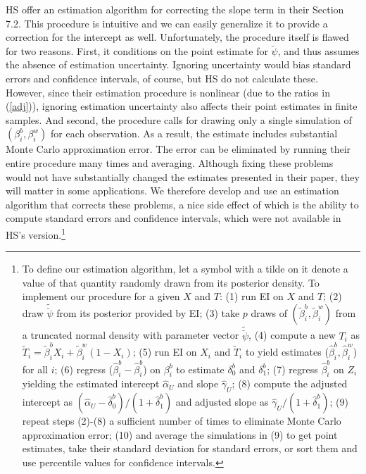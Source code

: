 \documentclass[11pt,titlepage]{article}
\newcommand{\psiu}{\breve{\psi}}
\begin{document}
HS offer an estimation algorithm for correcting the slope term in
their Section 7.2.  This procedure is intuitive and we can easily
generalize it to provide a correction for the intercept as well.
Unfortunately, the procedure itself is flawed for two reasons.  First,
it conditions on the point estimate for $\breve\psi$, and thus assumes
the absence of estimation uncertainty.  Ignoring uncertainty would
bias standard errors and confidence intervals, of course, but HS do
not calculate these.  However, since their estimation procedure is
nonlinear (due to the ratios in (\ref{adj})), ignoring estimation
uncertainty also affects their point estimates in finite samples.  And
second, the procedure calls for drawing only a single simulation of
$(\beta_i^b,\beta_i^w)$ for each observation.  As a result, the
estimate includes substantial Monte Carlo approximation error.  The
error can be eliminated by running their entire procedure many times
and averaging.  Although fixing these problems would not have
substantially changed the estimates presented in their paper, they
will matter in some applications.  We therefore develop and use an
estimation algorithm that corrects these problems, a nice side effect
of which is the ability to compute standard errors and confidence
intervals, which were not available in HS's version.\footnote{To
  define our estimation algorithm, let a symbol with a tilde on it
  denote a value of that quantity randomly drawn from its posterior
  density.  To implement our procedure for a given $X$ and $T$: (1)
  run EI on $X$ and $T$; (2) draw $\tilde\psiu$ from its posterior
  provided by EI; (3) take $p$ draws of
  $(\tilde\beta_i^b,\tilde\beta_i^w)$ from a truncated normal density
  with parameter vector $\tilde\psiu$, (4) compute a new $T_i$ as
  $\tilde T_i=\tilde\beta_i^bX_i+\tilde\beta_i^w(1-X_i)$; (5) run EI
  on $X_i$ and $\tilde T_i$ to yield estimates
  ($\hat\beta_i^b,\hat\beta_i^w$) for all $i$; (6) regress
  ($\hat\beta_i^b-\hat\beta_i^b$) on $\beta_i^b$ to estimate
  $\delta_0^b$ and $\delta_1^b$; (7) regress $\hat\beta_i^b$ on $Z_i$
  yielding the estimated intercept $\hat\alpha_U$ and slope
  $\hat\gamma_U$; (8) compute the adjusted intercept as
  $(\hat\alpha_U-\hat\delta_0^b)/(1+\hat\delta_1^b)$ and adjusted
  slope as $\hat\gamma_U/(1+\hat\delta_1^b)$; (9) repeat steps (2)-(8)
  a sufficient number of times to eliminate Monte Carlo approximation
  error; (10) and average the simulations in (9) to get point
  estimates, take their standard deviation for standard errors, or
  sort them and use percentile values for confidence intervals.}
\end{document}
